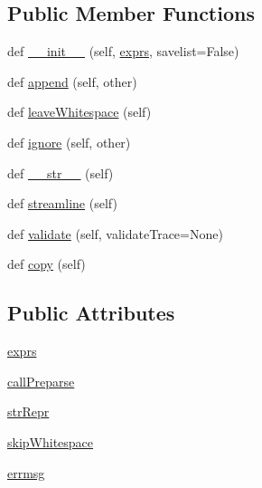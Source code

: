 \subsection*{Public Member Functions}
\begin{DoxyCompactItemize}
\item 
def \hyperlink{classpip_1_1__vendor_1_1pyparsing_1_1ParseExpression_a77738b164f338eac2a16ea2e18f8a862}{\+\_\+\+\_\+init\+\_\+\+\_\+} (self, \hyperlink{classpip_1_1__vendor_1_1pyparsing_1_1ParseExpression_a55b67003a1a014d5897ce2478411e75a}{exprs}, savelist=False)
\item 
def \hyperlink{classpip_1_1__vendor_1_1pyparsing_1_1ParseExpression_ac899bfcc8e7f11cf5616cb0a8096f30b}{append} (self, other)
\item 
def \hyperlink{classpip_1_1__vendor_1_1pyparsing_1_1ParseExpression_a493a22e063162597c0c7d737610830e2}{leave\+Whitespace} (self)
\item 
def \hyperlink{classpip_1_1__vendor_1_1pyparsing_1_1ParseExpression_a04d78cc9a328f47fd25bc79b3a9ad1e3}{ignore} (self, other)
\item 
def \hyperlink{classpip_1_1__vendor_1_1pyparsing_1_1ParseExpression_ac803c587a1d8893433a36b5bd20a02d3}{\+\_\+\+\_\+str\+\_\+\+\_\+} (self)
\item 
def \hyperlink{classpip_1_1__vendor_1_1pyparsing_1_1ParseExpression_a9ffaae514445b9770cadd3f1605e59a3}{streamline} (self)
\item 
def \hyperlink{classpip_1_1__vendor_1_1pyparsing_1_1ParseExpression_abfc553417d873dec8d747e9673bbe55d}{validate} (self, validate\+Trace=None)
\item 
def \hyperlink{classpip_1_1__vendor_1_1pyparsing_1_1ParseExpression_a86fe5bce370ec91fa10691ae2b0cb07a}{copy} (self)
\end{DoxyCompactItemize}
\subsection*{Public Attributes}
\begin{DoxyCompactItemize}
\item 
\hyperlink{classpip_1_1__vendor_1_1pyparsing_1_1ParseExpression_a55b67003a1a014d5897ce2478411e75a}{exprs}
\item 
\hyperlink{classpip_1_1__vendor_1_1pyparsing_1_1ParseExpression_a9be34423dff1666007c2e88d9c2671bd}{call\+Preparse}
\item 
\hyperlink{classpip_1_1__vendor_1_1pyparsing_1_1ParseExpression_af6cab62e110226141bcb9b97d984b66f}{str\+Repr}
\item 
\hyperlink{classpip_1_1__vendor_1_1pyparsing_1_1ParseExpression_afa61ecb81e411a4d886ecfd6844fc9e0}{skip\+Whitespace}
\item 
\hyperlink{classpip_1_1__vendor_1_1pyparsing_1_1ParseExpression_a5d1d1bf40042fd191a1cd0bb6652ea67}{errmsg}
\end{DoxyCompactItemize}
